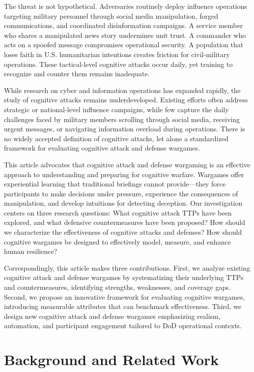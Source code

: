 \documentclass[12pt]{article}
\begin{document}
The threat is not hypothetical. Adversaries routinely deploy influence operations targeting military personnel through social media manipulation, forged communications, and coordinated disinformation campaigns. A service member who shares a manipulated news story undermines unit trust. A commander who acts on a spoofed message compromises operational security. A population that loses faith in U.S. humanitarian intentions creates friction for civil-military operations. These tactical-level cognitive attacks occur daily, yet training to recognize and counter them remains inadequate.

While research on cyber and information operations has expanded rapidly, the study of cognitive attacks remains underdeveloped. Existing efforts often address strategic or national-level influence campaigns, while few capture the daily challenges faced by military members scrolling through social media, receiving urgent messages, or navigating information overload during operations. There is no widely accepted definition of cognitive attacks, let alone a standardized framework for evaluating cognitive attack and defense wargames.

This article advocates that cognitive attack and defense wargaming is an effective approach to understanding and preparing for cognitive warfare. Wargames offer experiential learning that traditional briefings cannot provide---they force participants to make decisions under pressure, experience the consequences of manipulation, and develop intuitions for detecting deception. Our investigation centers on three research questions: What cognitive attack TTPs have been explored, and what defensive countermeasures have been proposed? How should we characterize the effectiveness of cognitive attacks and defenses? How should cognitive wargames be designed to effectively model, measure, and enhance human resilience?

Correspondingly, this article makes three contributions. First, we analyze existing cognitive attack and defense wargames by systematizing their underlying TTPs and countermeasures, identifying strengths, weaknesses, and coverage gaps. Second, we propose an innovative framework for evaluating cognitive wargames, introducing measurable attributes that can benchmark effectiveness. Third, we design new cognitive attack and defense wargames emphasizing realism, automation, and participant engagement tailored to DoD operational contexts.

\section{Background and Related Work}
\end{document}
